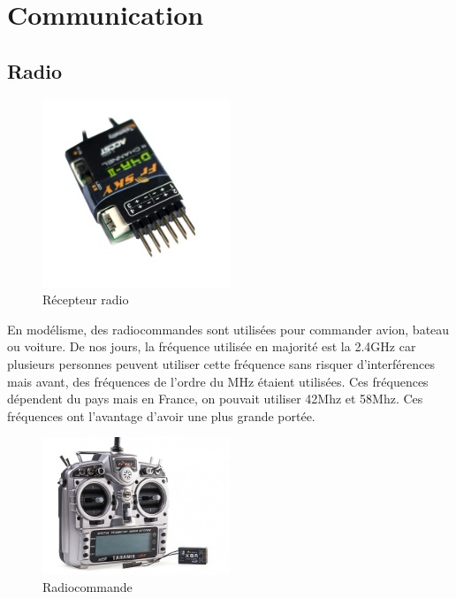 \documentclass[a4paper, 11pt]{report}
\begin{document}
\chapter{Communication}

\section{Radio}

\begin{figure}[h!]
\begin{centering}
\includegraphics[width=0.5\textwidth]{images/recepteurRadio.jpg}
\caption{Récepteur radio}
\par\end{centering}
\end{figure}

En modélisme, des radiocommandes sont utilisées pour commander avion, bateau ou voiture. De nos jours, la fréquence utilisée en majorité est la 2.4GHz car plusieurs personnes peuvent utiliser cette fréquence sans risquer d'interférences mais avant, des fréquences de l'ordre du MHz étaient utilisées. Ces fréquences dépendent du pays mais en France, on pouvait utiliser 42Mhz et 58Mhz. Ces fréquences ont l'avantage d'avoir une plus grande portée.

\begin{figure}[h!]
\begin{centering}
\includegraphics[width=0.5\textwidth]{images/taranis.jpg}
\caption{Radiocommande}
\par\end{centering}
\end{figure}
\end{document}
